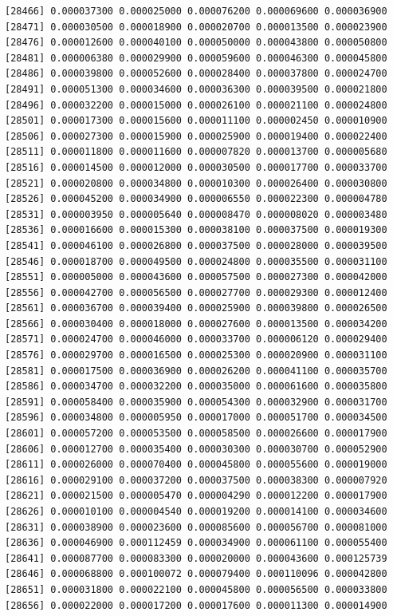\documentclass[]{article}
\begin{document}
\begin{verbatim}
[28466] 0.000037300 0.000025000 0.000076200 0.000069600 0.000036900
[28471] 0.000030500 0.000018900 0.000020700 0.000013500 0.000023900
[28476] 0.000012600 0.000040100 0.000050000 0.000043800 0.000050800
[28481] 0.000006380 0.000029900 0.000059600 0.000046300 0.000045800
[28486] 0.000039800 0.000052600 0.000028400 0.000037800 0.000024700
[28491] 0.000051300 0.000034600 0.000036300 0.000039500 0.000021800
[28496] 0.000032200 0.000015000 0.000026100 0.000021100 0.000024800
[28501] 0.000017300 0.000015600 0.000011100 0.000002450 0.000010900
[28506] 0.000027300 0.000015900 0.000025900 0.000019400 0.000022400
[28511] 0.000011800 0.000011600 0.000007820 0.000013700 0.000005680
[28516] 0.000014500 0.000012000 0.000030500 0.000017700 0.000033700
[28521] 0.000020800 0.000034800 0.000010300 0.000026400 0.000030800
[28526] 0.000045200 0.000034900 0.000006550 0.000022300 0.000004780
[28531] 0.000003950 0.000005640 0.000008470 0.000008020 0.000003480
[28536] 0.000016600 0.000015300 0.000038100 0.000037500 0.000019300
[28541] 0.000046100 0.000026800 0.000037500 0.000028000 0.000039500
[28546] 0.000018700 0.000049500 0.000024800 0.000035500 0.000031100
[28551] 0.000005000 0.000043600 0.000057500 0.000027300 0.000042000
[28556] 0.000042700 0.000056500 0.000027700 0.000029300 0.000012400
[28561] 0.000036700 0.000039400 0.000025900 0.000039800 0.000026500
[28566] 0.000030400 0.000018000 0.000027600 0.000013500 0.000034200
[28571] 0.000024700 0.000046000 0.000033700 0.000006120 0.000029400
[28576] 0.000029700 0.000016500 0.000025300 0.000020900 0.000031100
[28581] 0.000017500 0.000036900 0.000026200 0.000041100 0.000035700
[28586] 0.000034700 0.000032200 0.000035000 0.000061600 0.000035800
[28591] 0.000058400 0.000035900 0.000054300 0.000032900 0.000031700
[28596] 0.000034800 0.000005950 0.000017000 0.000051700 0.000034500
[28601] 0.000057200 0.000053500 0.000058500 0.000026600 0.000017900
[28606] 0.000012700 0.000035400 0.000030300 0.000030700 0.000052900
[28611] 0.000026000 0.000070400 0.000045800 0.000055600 0.000019000
[28616] 0.000029100 0.000037200 0.000037500 0.000038300 0.000007920
[28621] 0.000021500 0.000005470 0.000004290 0.000012200 0.000017900
[28626] 0.000010100 0.000004540 0.000019200 0.000014100 0.000034600
[28631] 0.000038900 0.000023600 0.000085600 0.000056700 0.000081000
[28636] 0.000046900 0.000112459 0.000034900 0.000061100 0.000055400
[28641] 0.000087700 0.000083300 0.000020000 0.000043600 0.000125739
[28646] 0.000068800 0.000100072 0.000079400 0.000110096 0.000042800
[28651] 0.000031800 0.000022100 0.000045800 0.000056500 0.000033800
[28656] 0.000022000 0.000017200 0.000017600 0.000011300 0.000014900

\end{verbatim}
\end{document}
